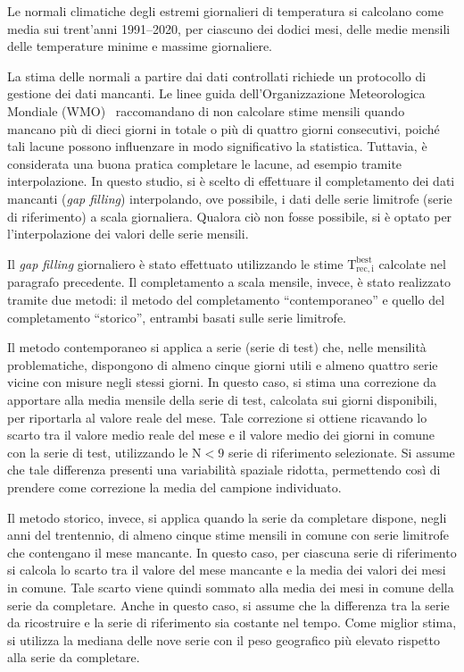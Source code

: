 Le normali climatiche degli estremi giornalieri di temperatura si calcolano come media sui trent'anni 1991--2020, per ciascuno dei dodici mesi, delle medie mensili delle temperature minime e massime giornaliere.

La stima delle normali a partire dai dati controllati richiede un protocollo di gestione dei dati mancanti. Le linee guida dell'Organizzazione Meteorologica Mondiale (WMO)~\cite{WMOGuidelinesNormalsCalculation2017} raccomandano di non calcolare stime mensili quando mancano più di dieci giorni in totale o più di quattro giorni consecutivi, poiché tali lacune possono influenzare in modo significativo la statistica. Tuttavia, è considerata una buona pratica completare le lacune, ad esempio tramite interpolazione. In questo studio, si è scelto di effettuare il completamento dei dati mancanti (\emph{gap filling}) interpolando, ove possibile, i dati delle serie limitrofe (serie di riferimento) a scala giornaliera. Qualora ciò non fosse possibile, si è optato per l'interpolazione dei valori delle serie mensili.

Il \emph{gap filling} giornaliero è stato effettuato utilizzando le stime \(\mathrm{T^{best}_{rec,i}}\) calcolate nel paragrafo precedente.
Il completamento a scala mensile, invece, è stato realizzato tramite due metodi: il metodo del completamento ``contemporaneo'' e quello del completamento ``storico'', entrambi basati sulle serie limitrofe.

Il metodo contemporaneo si applica a serie (serie di test) che, nelle mensilità problematiche, dispongono di almeno cinque giorni utili e almeno quattro serie vicine con misure negli stessi giorni. In questo caso, si stima una correzione da apportare alla media mensile della serie di test, calcolata sui giorni disponibili, per riportarla al valore reale del mese. Tale correzione si ottiene ricavando lo scarto tra il valore medio reale del mese e il valore medio dei giorni in comune con la serie di test, utilizzando le \(\mathrm{N} < 9\) serie di riferimento selezionate. Si assume che tale differenza presenti una variabilità spaziale ridotta, permettendo così di prendere come correzione la media del campione individuato.

Il metodo storico, invece, si applica quando la serie da completare dispone, negli anni del trentennio, di almeno cinque stime mensili in comune con serie limitrofe che contengano il mese mancante. In questo caso, per ciascuna serie di riferimento si calcola lo scarto tra il valore del mese mancante e la media dei valori dei mesi in comune. Tale scarto viene quindi sommato alla media dei mesi in comune della serie da completare. Anche in questo caso, si assume che la differenza tra la serie da ricostruire e la serie di riferimento sia costante nel tempo. Come miglior stima, si utilizza la mediana delle nove serie con il peso geografico più elevato rispetto alla serie da completare.